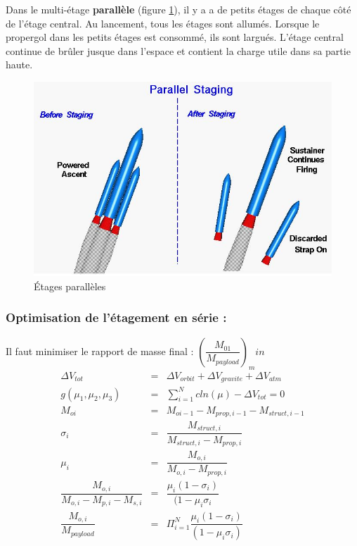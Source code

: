 \documentclass{report}
\begin{document}
Dans le multi-étage \textbf{parallèle} (figure \ref{55}), il y a a de petits étages de chaque côté de l'étage central. Au lancement, tous les étages sont allumés. Lorsque le propergol dans les petits étages est consommé, ils sont largués. L'étage central continue de brûler jusque dans l'espace et contient la charge utile dans sa partie haute.

\begin{figure}[h!]
    \centering
    \includegraphics[scale=0.7]{55}
    \caption{Étages parallèles}
    \label{55}
\end{figure}

\subsubsection{Optimisation de l'étagement en série :}

Il faut minimiser le rapport de masse final : $\left(\dfrac{M_{01}}{M_{payload}}\right)_min$\\

\begin{eqnarray}
\Delta V_{tot} &= &\Delta V_{orbit}+\Delta V_{gravite} +\Delta V_{atm}\\
g(\mu_1,\mu_2,\mu_3) &= &\sum_{i=1}^N c ln(\mu)-\Delta V_{tot} = 0\\
 M_{oi} &= &M_{oi-1}-M_{prop,i-1}-M_{struct,i-1} \\
\sigma_i &= &\dfrac{M_{struct,i}}{M_{struct,i}-M_{prop,i}}\\
\mu_i &= &\dfrac{M_{o,i}}{M_{o,i}-M_{prop,i}}\\
\dfrac{M_{o,i}}{M_{o,i}-M_{p,i}-M_{s,i}} &= &\dfrac{\mu_i(1-\sigma_i)}{(1-\mu_i\sigma_i}\\
\dfrac{M_{o,i}}{M_{payload}} &= &\Pi_{i=1}^N\dfrac{\mu_i(1-\sigma_i)}{(1-\mu_i\sigma_i)}
\end{eqnarray}
\end{document}

